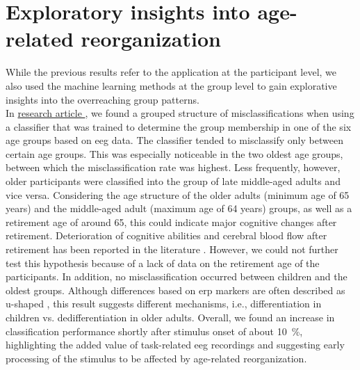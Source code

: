 \section{Exploratory insights into age-related reorganization}
While the previous results refer to the application at the participant level, we also used the machine learning methods at the group level to gain explorative insights into the overreaching group patterns.\\
In \hyperref[results:paperII]{research article }, we found a grouped structure of misclassifications when using a classifier that was trained to determine the group membership in one of the six age groups based on \gls{eeg} data. The classifier tended to misclassify only between certain age groups. This was especially noticeable in the two oldest age groups, between which the misclassification rate was highest. Less frequently, however, older participants were classified into the group of late middle-aged adults and vice versa. Considering the age structure of the older adults (minimum age of 65 years) and the middle-aged adult (maximum age of 64 years) groups, as well as a retirement age of around 65, this could indicate major cognitive changes after retirement. Deterioration of cognitive abilities and cerebral blood flow after retirement has been reported in the literature \cite{Celidoni2017, Rohwedder2010, Rogers1990}. However, we could not further test this hypothesis because of a lack of data on the retirement age of the participants. In addition, no misclassification occurred between children and the oldest groups. Although differences based on \gls{erp} markers are often described as u-shaped \cite{Mueller2008, Reuter2019}, this result suggests different mechanisms, i.e., differentiation in children vs. dedifferentiation in older adults. Overall, we found an increase in classification performance shortly after stimulus onset of about 10~\%, highlighting the added value of task-related \gls{eeg} recordings and suggesting early processing of the stimulus to be affected by age-related reorganization.\\
